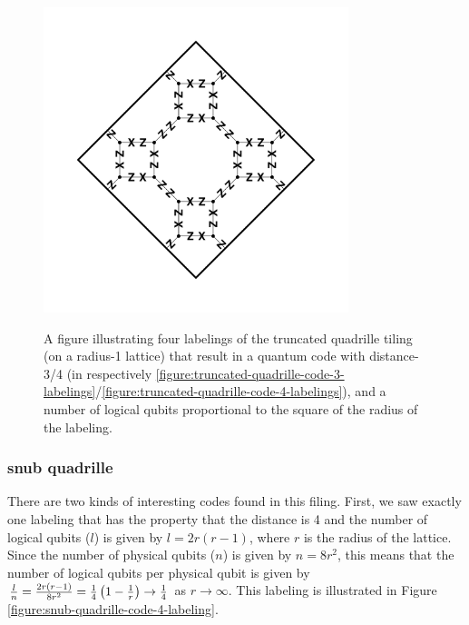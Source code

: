 \documentclass[twocolumn,showpacs,preprintnumbers,amsmath,amssymb,nofootinbib,pra,floatfix]{revtex4-1}
\begin{document}
\begin{figure}
{\includegraphics[width=3.5in]{truncated-quadrille-code-4-labeling-2}}\\
\caption{
\label{figure:truncated-quadrille-code-labelings}
A figure illustrating four labelings of the truncated quadrille tiling (on a radius-1 lattice) that result in a quantum code with distance-3/4 (in respectively \ref{figure:truncated-quadrille-code-3-labelings}/\ref{figure:truncated-quadrille-code-4-labelings}), and a number of logical qubits proportional to the square of the radius of the labeling.
}
\end{figure}
\subsubsection{snub quadrille}


There are two kinds of interesting codes found in this filing.  First, we saw exactly one labeling that has the property that the distance is 4 and the number of logical qubits ($l$) is given by $l=2r(r-1)$, where $r$ is the radius of the lattice.  Since the number of physical qubits ($n$) is given by $n=8r^2$, this means that the number of logical qubits per physical qubit is given by $\frac{l}{n}=\frac{2r(r-1)}{8r^2}=\frac{1}{4}\left(1-\frac{1}{r}\right)\to\frac{1}{4}$ as $r\to\infty$.  This labeling is illustrated in Figure \ref{figure:snub-quadrille-code-4-labeling}.
\end{document}
